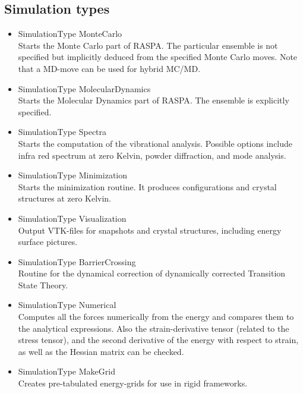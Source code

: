 \subsection*{Simulation types}
\begin{itemize}
\item{SimulationType MonteCarlo}\\
Starts the Monte Carlo part of RASPA. The particular ensemble is not specified but implicitly deduced from
the specified Monte Carlo moves. Note that a MD-move can be used for hybrid MC/MD.
\item{SimulationType MolecularDynamics}\\
Starts the Molecular Dynamics part of RASPA. The ensemble is explicitly specified.
\item{SimulationType Spectra}\\
Starts the computation of the vibrational analysis. Possible options include infra red spectrum at zero Kelvin,
powder diffraction, and mode analysis.
\item{SimulationType Minimization}\\
Starts the minimization routine. It produces configurations and crystal structures at zero Kelvin.
\item{SimulationType Visualization}\\
Output VTK-files for snapshots and crystal structures, including energy surface pictures.
\item{SimulationType BarrierCrossing}\\
Routine for the dynamical correction of dynamically corrected Transition State Theory.
\item{SimulationType Numerical}\\
Computes all the forces numerically from the energy and compares them to the analytical expressions.
Also the strain-derivative tensor (related to the stress tensor), and the second derivative of
the energy with respect to strain, as well as the Hessian matrix can be checked.
\item{SimulationType MakeGrid}\\
Creates pre-tabulated energy-grids for use in rigid frameworks.
\end{itemize}

